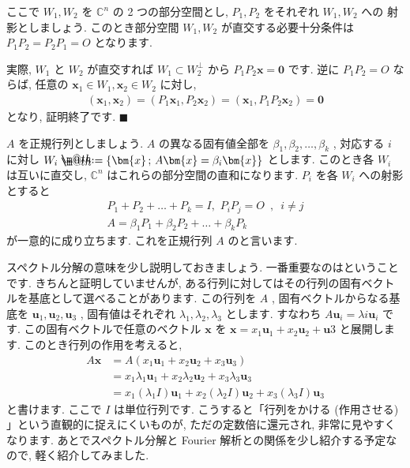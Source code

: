 \documentclass[openany, a4paper, oneside]{jsbook}
\makeatletter
\newcommand*{\defeq}{\mathrel{\rlap{%
\raisebox{0.3ex}{$\m@th\cdot$}}%
\raisebox{-0.3ex}{$\m@th\cdot$}}%
=}
\theoremstyle{break}
\theoremstyle{breakdefn}
\newcommand{\bC}{\mathbb{C}}
\makeatother
\begin{document}
ここで $W_1,W_2$ を $\bC^n$ の 2 つの部分空間とし,  $P_1,P_2$ をそれぞれ $W_1,W_2$ への
射影としましょう. このとき部分空間 $W_1,W_2$ が直交する必要十分条件は $P_1 P_2 = P_2 P_1 = O$ となります.

実際,  $W_1$ と $W_2$ が直交すれば $W_1 \subset W_2 ^{\perp}$ から $P_1 P_2 \bm{x}= \bm{0}$ です.
逆に $P_1 P_2 = O$ ならば, 任意の $\bm{x}_1 \in W_1,\bm{x}_2 \in W_2$ に対し,
    \begin{align}
        (\bm{x}_1,\bm{x}_2) = (P_1 \bm{x}_1,P_2 \bm{x}_2) = (\bm{x}_1,P_1 P_2\bm{x}_2) = \bm{0}
    \end{align}
となり, 証明終了です.  $\blacksquare$

$A$ を正規行列としましょう.  $A$ の異なる固有値全部を $\beta _1, \beta _2,\dots,\beta _k$ , 対応する
$i$ に対し $W_i \defeq \{ \bm{x} \, ; \, A\bm{x}=\beta _i \bm{x} \}$ とします.
このとき各 $W_i$ は互いに直交し,  $\bC^n$ はこれらの部分空間の直和になります.
$P_i$ を各 $W_i$ への射影とすると
\begin{gather}
P_1 + P_2 + \dots + P_k = I , \,\, P_i P_j = O \,\,\, , \,\,\,i \not = j \\
A = \beta _1 P_1 + \beta _2 P_2 + \dots + \beta _k P_k
\end{gather}
が一意的に成り立ちます. これを正規行列 $A$ のと言います.

スペクトル分解の意味を少し説明しておきましょう.
一番重要なのはということです.
きちんと証明していませんが, ある行列に対してはその行列の固有ベクトルを基底として選べることがあります.
この行列を $A$ , 固有ベクトルからなる基底を $\bm{u}_1,\bm{u}_2,\bm{u}_3$ ,
固有値はそれぞれ $\lambda_1,\lambda_2,\lambda_3$ とします.
すなわち $A\bm{u}_i=\lambda{i} \bm{u}_i$ です.
この固有ベクトルで任意のベクトル $\bm{x}$ を $\bm{x}=x_1\bm{u}_1+x_2\bm{u}_2+\bm{u}3$ と展開します.
このとき行列の作用を考えると,
    \begin{align}
        A \bm{x}
        &=
        A (x_1 \bm{u}_1 + x_2 \bm{u}_2 + x_3 \bm{u}_3 )\\
        &=
        x_1 \lambda_1  \bm{u}_1 + x_2 \lambda_2  \bm{u}_2 + x_3 \lambda_3  \bm{u}_3\\
        &=
        x_1 ( \lambda_1 I ) \bm{u}_1 + x_2 ( \lambda_2 I ) \bm{u}_2 + x_3 (\lambda_3 I ) \bm{u}_3
    \end{align}
と書けます. ここで $I$ は単位行列です.
こうすると「行列をかける (作用させる) 」という直観的に捉えにくいものが, ただの定数倍に還元され, 非常に見やすくなります.
あとでスペクトル分解と Fourier 解析との関係を少し紹介する予定なので, 軽く紹介してみました.
\end{document}
